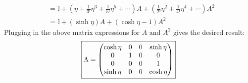 \documentclass[12pt]{article}
\begin{document}
\begin{enumerate}[label=(\alph*)]
\begin{align*}
        &= \mathbb{I} + \left(\eta + \frac{1}{3!}\eta^3 + \frac{1}{5!}\eta^5 + \cdots\right)A + \left(\frac{1}{2!}\eta^2 + \frac{1}{4!}\eta^4 + \cdots\right)A^2 \\
        &= \mathbb{I} + (\sinh\eta)A + (\cosh\eta - 1)A^2
    \end{align*}
    Plugging in the above matrix expressions for $A$ and $A^2$ gives the desired result:
    \[ \boxed{\Lambda = \mqty(\cosh\eta&0&0&\sinh\eta\\0&1&0&0\\0&0&0&1\\\sinh\eta&0&0&\cosh\eta)} \]
\end{enumerate}
\end{document}
